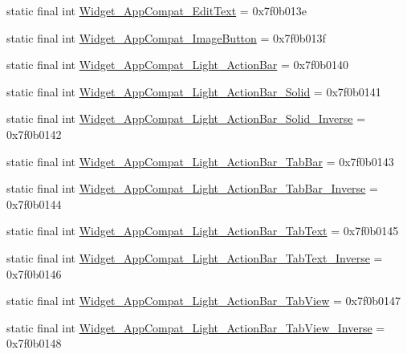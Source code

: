 \begin{CompactItemize}
\item 
static final int \hyperlink{classandroid_1_1support_1_1v7_1_1recyclerview_1_1_r_1_1style_944c2d474fe2a072447b38127a0d7eee}{Widget\_\-AppCompat\_\-EditText} = 0x7f0b013e
\item 
static final int \hyperlink{classandroid_1_1support_1_1v7_1_1recyclerview_1_1_r_1_1style_f64430f934e85ccbb6439c3b6cdddef3}{Widget\_\-AppCompat\_\-ImageButton} = 0x7f0b013f
\item 
static final int \hyperlink{classandroid_1_1support_1_1v7_1_1recyclerview_1_1_r_1_1style_14e0f6dfff29265501ce99c3e6291c2f}{Widget\_\-AppCompat\_\-Light\_\-ActionBar} = 0x7f0b0140
\item 
static final int \hyperlink{classandroid_1_1support_1_1v7_1_1recyclerview_1_1_r_1_1style_ea90ccdbf143f856312c53803e1438d6}{Widget\_\-AppCompat\_\-Light\_\-ActionBar\_\-Solid} = 0x7f0b0141
\item 
static final int \hyperlink{classandroid_1_1support_1_1v7_1_1recyclerview_1_1_r_1_1style_bcd081cae47fc1e98e2e62d395e95f18}{Widget\_\-AppCompat\_\-Light\_\-ActionBar\_\-Solid\_\-Inverse} = 0x7f0b0142
\item 
static final int \hyperlink{classandroid_1_1support_1_1v7_1_1recyclerview_1_1_r_1_1style_9ff814ebd168c05378be9cf159aaf29e}{Widget\_\-AppCompat\_\-Light\_\-ActionBar\_\-TabBar} = 0x7f0b0143
\item 
static final int \hyperlink{classandroid_1_1support_1_1v7_1_1recyclerview_1_1_r_1_1style_875dc49b4d8556eb22f7a029e02bf906}{Widget\_\-AppCompat\_\-Light\_\-ActionBar\_\-TabBar\_\-Inverse} = 0x7f0b0144
\item 
static final int \hyperlink{classandroid_1_1support_1_1v7_1_1recyclerview_1_1_r_1_1style_7e0a54dd61af52dd15fed33966c016e1}{Widget\_\-AppCompat\_\-Light\_\-ActionBar\_\-TabText} = 0x7f0b0145
\item 
static final int \hyperlink{classandroid_1_1support_1_1v7_1_1recyclerview_1_1_r_1_1style_65e2d670a4c8d92d8e51ba8aceb5b2b0}{Widget\_\-AppCompat\_\-Light\_\-ActionBar\_\-TabText\_\-Inverse} = 0x7f0b0146
\item 
static final int \hyperlink{classandroid_1_1support_1_1v7_1_1recyclerview_1_1_r_1_1style_86d79a84179bce209d14f517da9ab17b}{Widget\_\-AppCompat\_\-Light\_\-ActionBar\_\-TabView} = 0x7f0b0147
\item 
static final int \hyperlink{classandroid_1_1support_1_1v7_1_1recyclerview_1_1_r_1_1style_4b73b1459935e5fbe6a109030d9ec389}{Widget\_\-AppCompat\_\-Light\_\-ActionBar\_\-TabView\_\-Inverse} = 0x7f0b0148
\item 

\end{CompactItemize}
